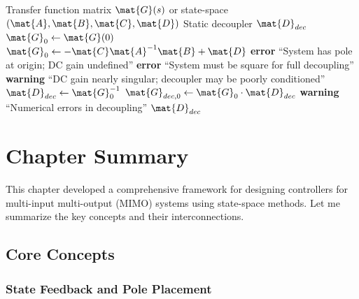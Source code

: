 \begin{algorithm}[H]
\caption{Static Decoupling Matrix}
\label{alg:decoupling}
\begin{algorithmic}[1]
\REQUIRE Transfer function matrix $\mat{G}(s)$ or state-space $(\mat{A}, \mat{B}, \mat{C}, \mat{D})$
\ENSURE Static decoupler $\mat{D}_{dec}$
\STATE
{}
    \STATE $\mat{G}_0 \gets \mat{G}(0)$
\ELSE
        \STATE $\mat{G}_0 \gets -\mat{C}\mat{A}^{-1}\mat{B} + \mat{D}$
    \ELSE
        \STATE \textbf{error} ``System has pole at origin; DC gain undefined''
    \ENDIF
\ENDIF
\STATE
{}
    \STATE \textbf{error} ``System must be square for full decoupling''
\ENDIF
{}
    \STATE \textbf{warning} ``DC gain nearly singular; decoupler may be poorly conditioned''
\ENDIF
\STATE
{}
\STATE $\mat{D}_{dec} \gets \mat{G}_0^{-1}$
\STATE
{}
\STATE $\mat{G}_{dec,0} \gets \mat{G}_0 \cdot \mat{D}_{dec}$
    \STATE \textbf{warning} ``Numerical errors in decoupling''
\ENDIF
\STATE
\RETURN $\mat{D}_{dec}$
\end{algorithmic}
\end{algorithm}

\section{Chapter Summary}
\label{sec:summary}

This chapter developed a comprehensive framework for designing controllers for multi-input multi-output (MIMO) systems using state-space methods. Let me summarize the key concepts and their interconnections.

\subsection{Core Concepts}

\subsubsection{State Feedback and Pole Placement}

